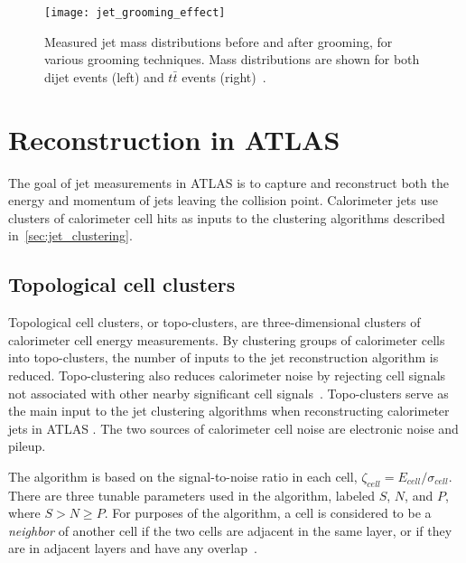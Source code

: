 \begin{figure}[!ht]
    \centering
\texttt{[image: jet\_grooming\_effect]}
\caption{Measured jet mass distributions before and after grooming, for various grooming techniques.
Mass distributions are shown for both dijet events (left) and $t\bar{t}$ events (right)~\cite{jet-tasi-substructure}.}
\label{fig:jet_grooming_effect}
\end{figure}

\section{Reconstruction in ATLAS}\label{sec:jet_reconstruction}
The goal of jet measurements in ATLAS is to capture and reconstruct both the energy and momentum of jets leaving the collision point.
Calorimeter jets use clusters of calorimeter cell hits as inputs to the clustering algorithms described in~\ref{sec:jet_clustering}.

\subsection{Topological cell clusters}\label{subsec:jet_topo_clusters}
Topological cell clusters, or topo-clusters, are three-dimensional clusters of calorimeter cell energy measurements.
By clustering groups of calorimeter cells into topo-clusters, the number of inputs to the jet reconstruction algorithm is reduced.
Topo-clustering also reduces calorimeter noise by rejecting cell signals not associated with other nearby significant cell signals~\cite{jet-topo-cluster}.
Topo-clusters serve as the main input to the jet clustering algorithms when reconstructing calorimeter jets in ATLAS .
The two sources of calorimeter cell noise are electronic noise and pileup.

The algorithm is based on the signal-to-noise ratio in each cell, $\zeta_{cell} = E_{cell}/\sigma_{cell}$.
There are three tunable parameters used in the algorithm, labeled $S$, $N$, and $P$, where $S > N \geq P$.
For purposes of the algorithm, a cell is considered to be a \textit{neighbor} of another cell if the two cells are
adjacent in the same layer, or if they are in adjacent layers and have any overlap~\cite{jet-topo-cluster}.

